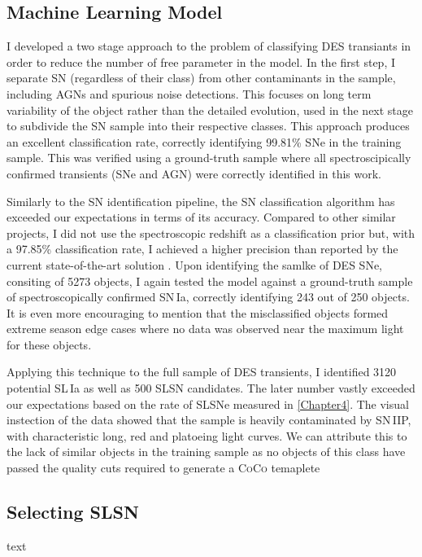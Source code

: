 \subsection{Machine Learning Model}
I developed a two stage approach to the problem of classifying DES transiants in order to reduce the number of free parameter in the model. In the first step, I separate SN (regardless of their class) from other contaminants in the sample, including AGNs and spurious noise detections. This focuses on long term variability of the object rather than the detailed evolution, used in the next stage to subdivide the SN sample
into their respective classes. This approach produces an excellent classification rate, correctly identifying 99.81\% SNe in the training sample. This was verified using a ground-truth sample where all spectroscipically confirmed transients (SNe and AGN) were correctly identified in this work.

Similarly to the SN identification pipeline, the SN classification algorithm has exceeded our expectations in terms of its accuracy. Compared to other similar projects, I did not use the spectroscopic redshift as a classification prior but, with a 97.85\% classification rate, I achieved a higher precision than reported by the current state-of-the-art solution \citep{Lochner2016}. Upon identifying the samlke of DES SNe, consiting of 5273 objects, I again tested the model against a ground-truth sample of spectroscopically confirmed SN\,Ia, correctly identifying 243 out of 250 objects. It is even more encouraging to mention that the misclassified objects formed extreme season edge cases where no data was observed near the maximum light for these objects.

Applying this technique to the full sample of DES transients, I identified 3120 potential SL\,Ia as well as 500 SLSN candidates. The later number vastly exceeded our expectations based on the rate of SLSNe measured in \cref{Chapter4}. The visual instection of the data showed that the sample is heavily contaminated by SN\,IIP, with characteristic long, red and platoeing light curves. We can attribute this to the lack of similar objects in the training sample as no objects of this class have passed the quality cuts required to generate a \textsc{CoCo} temaplete

\subsection{Selecting SLSN}
text

